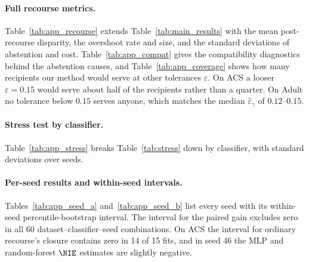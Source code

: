\paragraph{Full recourse metrics.}
Table~\ref{tab:app_recourse} extends Table~\ref{tab:main_results} with the
mean post-recourse disparity, the overshoot rate and size, and the standard
deviations of abstention and cost. Table~\ref{tab:app_compat} gives the
compatibility diagnostics behind the abstention causes, and
Table~\ref{tab:app_coverage} shows how many recipients our method would serve
at other tolerances $\varepsilon$. On ACS a looser $\varepsilon=0.15$ would
serve about half of the recipients rather than a quarter. On Adult no
tolerance below $0.15$ serves anyone, which matches the median
$\hat\varepsilon_\gamma$ of $0.12$--$0.15$.

\paragraph{Stress test by classifier.}
Table~\ref{tab:app_stress} breaks Table~\ref{tab:stress} down by classifier,
with standard deviations over seeds.

\paragraph{Per-seed results and within-seed intervals.}
Tables~\ref{tab:app_seed_a} and~\ref{tab:app_seed_b} list every seed with its
within-seed percentile-bootstrap interval. The interval for the paired gain
excludes zero in all 60 dataset--classifier--seed combinations. On ACS the
interval for ordinary recourse's closure contains zero in 14 of 15 fits, and
in seed 46 the MLP and random-forest $\NIE$ estimates are slightly negative.



